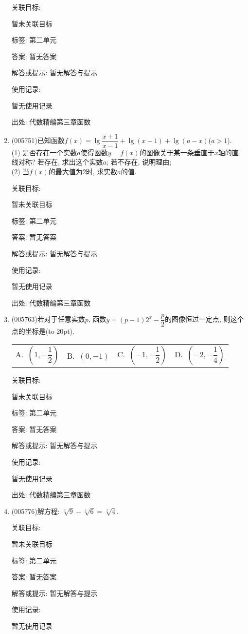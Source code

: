 \documentclass[10pt,a4paper]{article}
\newcommand{\bracket}[1]{(\hbox to #1pt{})}
\newcommand{\fourch}[4]{\par\begin{tabular}{p{.23\textwidth}p{.23\textwidth}p{.23\textwidth}p{.23\textwidth}}
A.~#1 &B.~#2& C.~#3& D.~#4
\end{tabular}}
\begin{document}
\begin{enumerate}[1.]
关联目标:

暂未关联目标



标签: 第二单元

答案: 暂无答案

解答或提示: 暂无解答与提示

使用记录:

暂无使用记录


出处: 代数精编第三章函数
\item { (005751)}已知函数$f(x)=\lg \dfrac{x+1}{x-1}+\lg (x-1)+\lg (a-x)$($a>1$).\\
(1) 是否存在一个实数$a$使得函数$y=f(x)$的图像关于某一条垂直于$x$轴的直线对称? 若存在, 求出这个实数$a$; 若不存在, 说明理由;\\
(2) 当$f(x)$的最大值为2时, 求实数$a$的值.


关联目标:

暂未关联目标



标签: 第二单元

答案: 暂无答案

解答或提示: 暂无解答与提示

使用记录:

暂无使用记录


出处: 代数精编第三章函数
\item { (005763)}若对于任意实数$p$, 函数$y=(p-1)2^x-\dfrac p2$的图像恒过一定点, 则这个点的坐标是\bracket{20}.
\fourch{$(1,-\dfrac 12)$}{$(0, -1)$}{$(-1,-\dfrac 12)$}{$(-2,-\dfrac 14)$}


关联目标:

暂未关联目标



标签: 第二单元

答案: 暂无答案

解答或提示: 暂无解答与提示

使用记录:

暂无使用记录


出处: 代数精编第三章函数
\item { (005776)}解方程: $\sqrt[x]9-\sqrt[x]6=\sqrt[x]4$.


关联目标:

暂未关联目标



标签: 第二单元

答案: 暂无答案

解答或提示: 暂无解答与提示

使用记录:

暂无使用记录



\end{enumerate}
\end{document}
